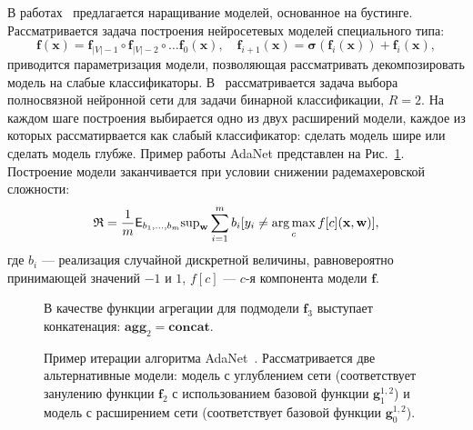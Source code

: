 В работах~\cite{boost_res,adanet} предлагается наращивание моделей, основанное на бустинге. Рассматривается задача построения нейросетевых моделей специального типа:
\[
    \mathbf{f}(\mathbf{x}) = \mathbf{f}_{|V|-1} \circ \mathbf{f}_{|V|-2} \circ \dots \mathbf{f}_0(\mathbf{x}), \quad  \mathbf{f}_{i+1}(\mathbf{x}) = \boldsymbol{\sigma}\left(\mathbf{f}_i(\mathbf{x})\right) + \mathbf{f}_i(\mathbf{x}),
\]
приводится параметризация модели, позволяющая рассматривать декомпозировать модель на слабые классификаторы.
В~\cite{adanet} рассматривается задача выбора полносвязной нейронной сети для задачи бинарной классификации, $R=2$. На каждом шаге построения выбирается одно из двух расширений модели, каждое из которых рассматирвается как слабый классификатор: сделать модель шире или сделать модель глубже. Пример работы AdaNet представлен на Рис.~\ref{fig:scheme_adanet}.
Построение модели заканчивается при условии снижении радемахеровской сложности:
\begin{equation}
\label{eq:rad}
    \mathfrak{R} = \frac{1}{m}\mathsf{E}_{{b}_1,\dots, {b}_{m}} \text{sup}_{\mathbf{w}} \sum_{i=1}^m   {b}_i [y_i \neq \operatorname*{arg\,max}_{c} f[c](\mathbf{x}, \mathbf{w})],
\end{equation}
где ${b}_i$ --- реализация случайной дискретной величины, равновероятно принимающей значений $-1$ и $1$, $f[c]$ --- $c$-я компонента модели $\mathbf{f}$.

\begin{figure}

\caption{Пример итерации алгоритма AdaNet~\cite{adanet}. Рассматривается две альтернативные модели: модель с углублением сети (соответствует занулению функции $\mathbf{f}_2$ с использованием базовой функции $\mathbf{g}^{1,2}_1$) и модель с расширением сети (соответствует базовой функции $\mathbf{g}^{1,2}_0$).} В качестве функции агрегации для подмодели $\mathbf{f}_3$ выступает конкатенация: $\textbf{agg}_2 = \textbf{concat}$.
\label{fig:scheme_adanet}
\end{figure}

